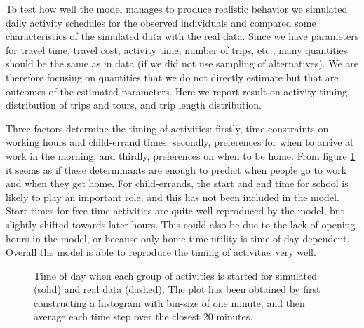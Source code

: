 To test how well the model manages to produce realistic behavior we simulated daily activity schedules for the observed individuals and compared some characteristics of the simulated data with the real data. Since we have parameters for travel time, travel cost, activity time, number of trips, etc., many quantities should be the same as in data (if we did not use sampling of alternatives). We are therefore focusing on quantities that we do not directly estimate but that are outcomes of the estimated parameters. Here we report result on activity timing, distribution of trips and tours, and trip length distribution.

Three factors determine the timing of activities: firstly, time constraints on working hours and child-errand times; secondly, preferences for when to arrive at work in the morning; and thirdly, preferences on when to be home. 
From figure \ref{fig:actstarttime} it seems as if these determinants are enough to predict when people go to work and when they get home. For child-errands, the start and end time for school is likely to play an important role, and this has not been included in the model. Start times for free time activities are quite well reproduced by the model, but slightly shifted towards later hours. This could also be due to the lack of opening hours in the model, or because only home-time utility is time-of-day dependent. Overall the model is able to reproduce the timing of activities very well.


\begin{figure}
	\caption{Time of day when each group of activities is started for simulated (solid) and real data (dashed). The plot has been obtained by first constructing a histogram with bin-size of one minute, and then average each time step over the closest 20 minutes.\label{fig:actstarttime}}
\end{figure}

